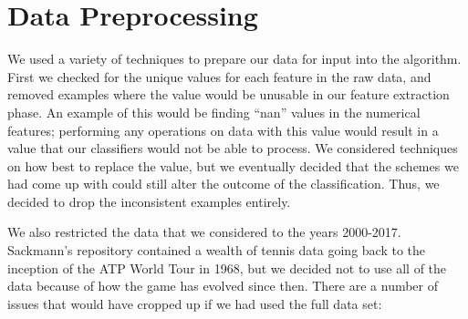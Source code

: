 \documentclass[conference]{IEEEtran}
\begin{document}


\section{Data Preprocessing}
We used a variety of techniques to prepare our data for input into the algorithm. First we checked for the unique values for each feature in the raw data, and removed examples where the value would be unusable in our feature extraction phase. An example of this would be finding ``nan'' values in the numerical features; performing any operations on data with this value would result in a value that our classifiers would not be able to process. We considered techniques on how best to replace the value, but we eventually decided that the schemes we had come up with could still alter the outcome of the classification. Thus, we decided to drop the inconsistent examples entirely.

We also restricted the data that we considered to the years 2000-2017. Sackmann's repository contained a wealth of tennis data going back to the inception of the ATP World Tour in 1968, but we decided not to use all of the data because of how the game has evolved since then. There are a number of issues that would have cropped up if we had used the full data set:
\end{document}

